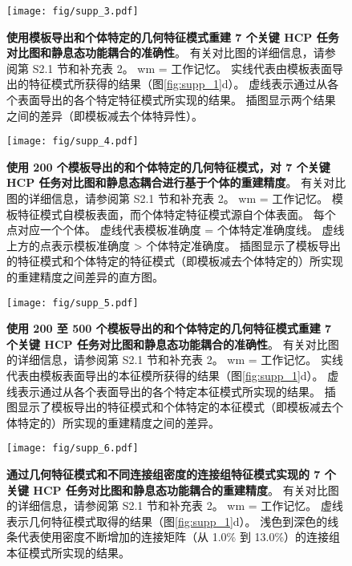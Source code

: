 \documentclass[lang=cn,a4paper,newtx]{elegantpaper}
\begin{document}
\begin{figure}[!htb] 
	\centering
	\texttt{[image: fig/supp\_3.pdf]}
	\caption{\textbf{使用模板导出和个体特定的几何特征模式重建 7 个关键 HCP 任务对比图和静息态功能耦合的准确性}。
		有关对比图的详细信息，请参阅第 S2.1 节和补充表 2。 
		wm = 工作记忆。
		实线代表由模板表面导出的特征模式所获得的结果（图\ref{fig:supp_1}d）。
		虚线表示通过从各个表面导出的各个特定特征模式所实现的结果。
		插图显示两个结果之间的差异（即模板减去个体特异性）。} \label{fig:supp_3}
\end{figure}




\begin{figure}[!htb] 
	\centering
	\texttt{[image: fig/supp\_4.pdf]}
	\caption{\textbf{使用 200 个模板导出的和个体特定的几何特征模式，对 7 个关键 HCP 任务对比图和静息态耦合进行基于个体的重建精度}。
		有关对比图的详细信息，请参阅第 S2.1 节和补充表 2。
		wm = 工作记忆。
		模板特征模式自模板表面，而个体特定特征模式源自个体表面。
		每个点对应一个个体。
		虚线代表模板准确度 = 个体特定准确度线。
		虚线上方的点表示模板准确度 > 个体特定准确度。
		插图显示了模板导出的特征模式和个体特定的特征模式（即模板减去个体特定的）所实现的重建精度之间差异的直方图。} \label{fig:supp_4}
\end{figure}


\begin{figure}[!htb] 
	\centering
	\texttt{[image: fig/supp\_5.pdf]}
	\caption{\textbf{使用 200 至 500 个模板导出的和个体特定的几何特征模式重建 7 个关键 HCP 任务对比图和静息态功能耦合的准确性}。
		有关对比图的详细信息，请参阅第 S2.1 节和补充表 2。
		wm = 工作记忆。
		实线代表由模板表面导出的本征模所获得的结果（图\ref{fig:supp_1}d）。
		虚线表示通过从各个表面导出的各个特定本征模式所实现的结果。
		插图显示了模板导出的特征模式和个体特定的本征模式（即模板减去个体特定的）所实现的重建精度之间的差异。} \label{fig:supp_5}
\end{figure}



\begin{figure}[!htb] 
	\centering
	\texttt{[image: fig/supp\_6.pdf]}
	\caption{
		\textbf{通过几何特征模式和不同连接组密度的连接组特征模式实现的 7 个关键 HCP 任务对比图和静息态功能耦合的重建精度}。
		有关对比图的详细信息，请参阅第 S2.1 节和补充表 2。
		wm = 工作记忆。
		虚线表示几何特征模式取得的结果（图\ref{fig:supp_1}d）。
		浅色到深色的线条代表使用密度不断增加的连接矩阵（从 1.0\% 到 13.0\%）的连接组本征模式所实现的结果。
	} \label{fig:supp_6}
\end{figure}
\end{document}
